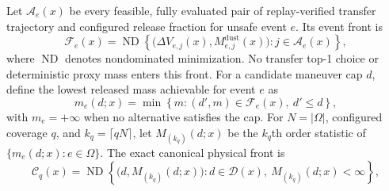     Let \(\mathcal{A}_e(x)\) be every feasible, fully evaluated pair of replay-verified transfer trajectory and configured release fraction for unsafe event \(e\). Its event front is
    \begin{equation}
        \mathcal{F}_e(x)=\operatorname{ND}\!\left\{
        \bigl(\Delta V_{e,j}(x),M^{\mathrm{dust}}_{e,j}(x)\bigr):
        j\in\mathcal{A}_e(x)\right\},
        \label{eq:event_resource_front}
    \end{equation}
    where \(\operatorname{ND}\) denotes nondominated minimization. No transfer top-1 choice or deterministic proxy mass enters this front. For a candidate maneuver cap \(d\), define the lowest released mass achievable for event \(e\) as
    \begin{equation}
        m_e(d;x)=\min\left\{m:(d',m)\in\mathcal{F}_e(x),\ d'\le d\right\},
        \label{eq:event_mass_at_dv_cap}
    \end{equation}
    with \(m_e=+\infty\) when no alternative satisfies the cap. For \(N=|\Omega|\), configured coverage \(q\), and \(k_q=\lceil qN\rceil\), let \(M_{(k_q)}(d;x)\) be the \(k_q\)th order statistic of \(\{m_e(d;x):e\in\Omega\}\). The exact canonical physical front is
    \begin{equation}
        \mathcal{C}_q(x)=\operatorname{ND}\!\left\{
        \bigl(d,M_{(k_q)}(d;x)\bigr):d\in\mathcal{D}(x),\
        M_{(k_q)}(d;x)<\infty\right\},
        \label{eq:coverage_box_front}
    \end{equation}

